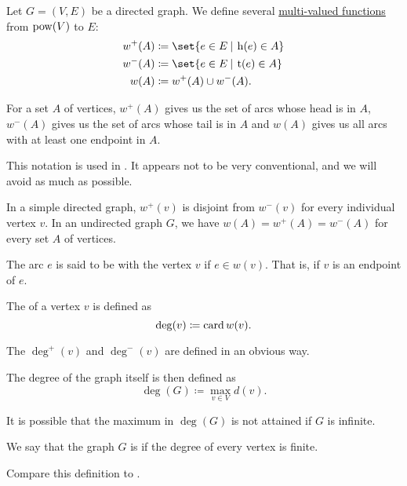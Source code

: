 \begin{definition}\label{def:graph_incidence}
  Let \( G = (V, E) \) be a directed graph. We define several \hyperref[def:multi_valued_function]{multi-valued functions} from \( \operatorname{pow}(V) \) to \( E \):
  \begin{align*}
     w^+(A) &\coloneqq \set{ e \in E \given \head(e) \in A } \\
     w^-(A) &\coloneqq \set{ e \in E \given \tail(e) \in A } \\
     w(A)   &\coloneqq w^+(A) \cup w^-(A).
  \end{align*}

  For a set \( A \) of vertices, \( w^+(A) \) gives us the set of arcs whose head is in \( A \), \( w^-(A) \) gives us the set of arcs whose tail is in \( A \) and \( w(A) \) gives us all arcs with at least one endpoint in \( A \).

  This notation is used in \cite[ch. 1, sec. 1.4]{GondranMinoux1984Graphs}. It appears not to be very conventional, and we will avoid as much as possible.

  In a simple directed graph, \( w^+(v) \) is disjoint from \( w^-(v) \) for every individual vertex \( v \). In an undirected graph \( G \), we have \( w(A) = w^+(A) = w^-(A) \) for every set \( A \) of vertices.

  \begin{thmenum}
     The arc \( e \) is said to be  with the vertex \( v \) if \( e \in w(v) \). That is, if \( v \) is an endpoint of \( e \).

     The  of a vertex \( v \) is defined as
    \begin{equation*}
      \deg(v) \coloneqq \operatorname{card} w(v).
    \end{equation*}

    The  \( \deg^+(v) \) and  \( \deg^-(v) \) are defined in an obvious way.

    The degree of the graph itself is then defined as
    \begin{equation*}
      \deg(G) \coloneqq \max_{v \in V} d(v).
    \end{equation*}

    It is possible that the maximum in \( \deg(G) \) is not attained if \( G \) is infinite.

     We say that the graph \( G \) is  if the degree of every vertex is finite.

    Compare this definition to .
  \end{thmenum}
\end{definition}

